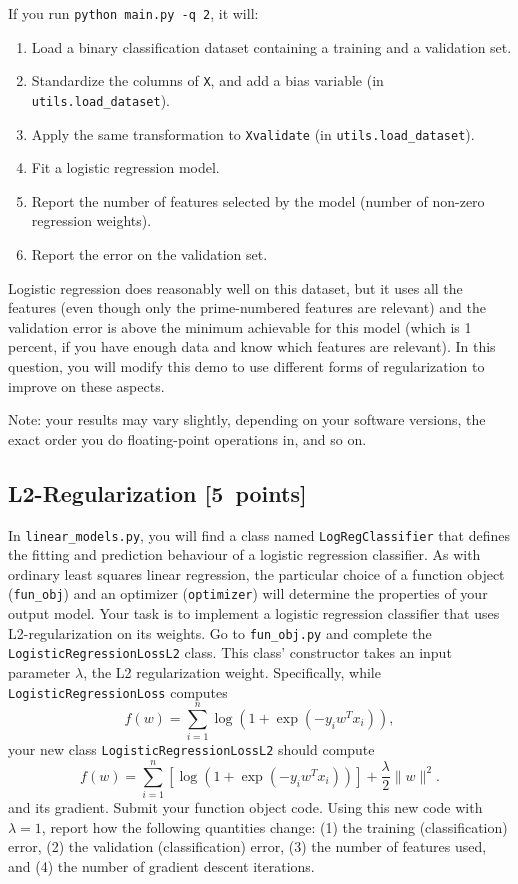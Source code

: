 \documentclass{article}
\newcommand{\blu}[1]{{\textcolor{blu}{#1}}}
\let\ask\blu
\newcommand\pts[1]{\textcolor{pointscolour}{[#1~points]}}
\newcommand{\norm}[1]{\lVert #1 \rVert}
\begin{document}
If you run  \verb|python main.py -q 2|, it will:
\begin{enumerate}
\item Load a binary classification dataset containing a training and a validation set.
\item Standardize the columns of \verb|X|, and add a bias variable (in \verb|utils.load_dataset|).
\item Apply the same transformation to \verb|Xvalidate| (in \verb|utils.load_dataset|).
\item Fit a logistic regression model.
\item Report the number of features selected by the model (number of non-zero regression weights).
\item Report the error on the validation set.
\end{enumerate}
Logistic regression does reasonably well on this dataset,
but it uses all the features (even though only the prime-numbered features are relevant)
and the validation error is above the minimum achievable for this model
(which is 1 percent, if you have enough data and know which features are relevant).
In this question, you will modify this demo to use different forms of regularization
 to improve on these aspects.

Note: your results may vary slightly, depending on your software versions, the exact order you do floating-point operations in, and so on.


\subsection{L2-Regularization \pts{5}}

In \verb|linear_models.py|, you will find a class named \verb|LogRegClassifier| that defines the fitting and prediction behaviour of a logistic regression classifier. As with ordinary least squares linear regression, the particular choice of a function object (\verb|fun_obj|) and an optimizer (\verb|optimizer|) will determine the properties of your output model.
Your task is to implement a logistic regression classifier that uses L2-regularization on its weights. Go to \verb|fun_obj.py| and complete the \verb|LogisticRegressionLossL2| class. This class' constructor takes an input parameter $\lambda$, the L2 regularization weight. Specifically, while \verb|LogisticRegressionLoss| computes
\[
f(w) = \sum_{i=1}^n \log(1+\exp(-y_iw^Tx_i)),
\]
your new class \verb|LogisticRegressionLossL2| should compute
\[
f(w) = \sum_{i=1}^n \left[\log(1+\exp(-y_iw^Tx_i))\right] + \frac{\lambda}{2}\norm{w}^2.
\]
and its gradient.
\ask{Submit your function object code. Using this new code with $\lambda = 1$, report how the following quantities change: (1) the training (classification) error, (2) the validation (classification) error, (3) the number of features used, and (4) the number of gradient descent iterations.}
\end{document}
